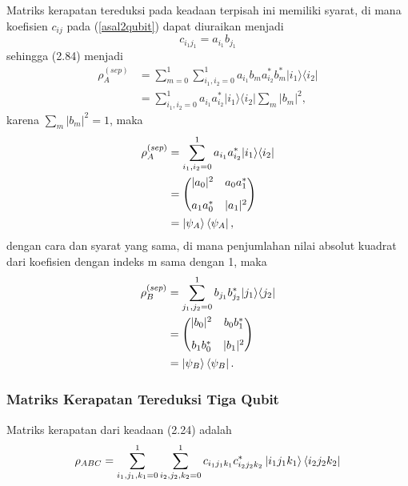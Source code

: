 \par
Matriks kerapatan tereduksi pada keadaan terpisah ini memiliki syarat, di mana koefisien $c_{ij}$ pada (\ref{asal2qubit}) dapat diuraikan menjadi
\begin{equation}
	c_{i_1j_1}=a_{i_1}b_{j_1}
\end{equation}
sehingga (2.84) menjadi
\begin{align*}
	\rho_{A}^{(sep)} 
	&= \sum_{m=0}^{1} \sum_{i_1,i_2=0}^{1}a_{i_1}b_m a^{*}_{i_2}b^{*}_m|i_1\rangle \langle i_2| \\
	&=\sum_{i_1,i_2=0}^{1}a_{i_1}a^{*}_{i_2}|i_1\rangle \langle i_2|\sum_{m}|b_m|^2,
\end{align*}
karena $\sum_{m}|b_m|^2=1$, maka
\begin{equation}
	\begin{aligned}
		\rho_{A}^{(sep)} &=\sum_{i_1,i_2=0}^{1}a_{i_1} a^{*}_{i_2}|i_1\rangle \langle i_2|\\
		&=
		\begin{pmatrix}
			|a_0|^{2}
			&
			a_0 a_1^{*}
			\\[0.3cm]
			a_1 a_0^{*}
			&
			|a_1|^{2}
		\end{pmatrix}\\
		&=\ket{\psi_A}\bra{\psi_A},
	\end{aligned}
\end{equation}
dengan cara dan syarat yang sama, di mana penjumlahan nilai absolut kuadrat dari koefisien dengan indeks m sama dengan 1, maka
\begin{equation}
	\begin{aligned}
		\rho_{B}^{(sep)} 
		&= \sum_{j_1,j_2=0}^{1} b_{j_1}b^{*}_{j_2}|j_1\rangle \langle j_2|\\
		&=
		\begin{pmatrix}
			|b_0|^{2}
			&
			b_0 b_1^{*}
			\\[0.3cm]
			b_1 b_0^{*}
			&
			|b_1|^{2}
		\end{pmatrix}\\
		&=\ket{\psi_B}\bra{\psi_B}.
	\end{aligned}
\end{equation}

\subsubsection{Matriks Kerapatan Tereduksi Tiga Qubit}
Matriks kerapatan dari keadaan (2.24) adalah
\begin{equation}
	\rho_{ABC}=\sum_{i_1,j_1,k_1=0}^1\sum_{i_2,j_2,k_2=0}^1 c_{i_1j_1k_1} c^{*}_{i_2j_2k_2}\ket{i_1j_1k_1}\bra{i_2j_2k_2}\label{asal3qubit}
\end{equation}

